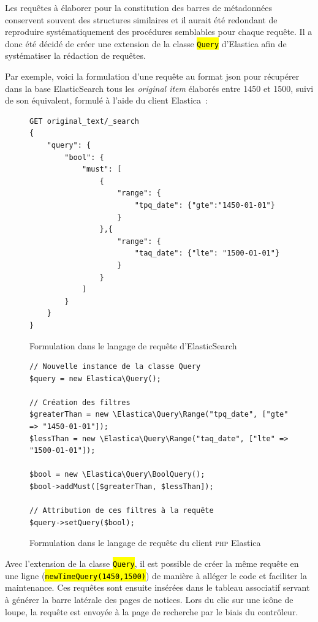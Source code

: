 \documentclass[a4paper,12pt,twoside]{book}
\let\OldTexttt\texttt
\renewcommand{\texttt}[1]{\OldTexttt{\hl{#1}}}
\newcommand{\eng}{\emph}
\newcommand{\oi}{\eng{original item}\xspace}
\newcommand{\json}{\gls{json}\xspace}
\begin{document}
Les requêtes à élaborer pour la constitution des barres de métadonnées conservent souvent des structures similaires et il aurait été redondant de reproduire systématiquement des procédures semblables pour chaque requête. Il a donc été décidé de créer une extension de la classe \texttt{Query} d'Elastica afin de systématiser la rédaction de requêtes.

Par exemple, voici la formulation d'une requête au format \json pour récupérer dans la base ElasticSearch tous les \oi élaborés entre 1450 et 1500, suivi de son équivalent, formulé à l'aide du client Elastica~:

\begin{figure}[H]
\begin{lstlisting}
GET original_text/_search
{
    "query": {
        "bool": {
            "must": [
                {
                    "range": {
                        "tpq_date": {"gte":"1450-01-01"}
                    }
                },{
                    "range": {
                        "taq_date": {"lte": "1500-01-01"}
                    }
                }
            ]
        }
    }
}
\end{lstlisting}
\caption{Formulation dans le langage de requête d'ElasticSearch}
\end{figure}

\begin{figure}[H]
\begin{lstlisting}
// Nouvelle instance de la classe Query
$query = new Elastica\Query();

// Création des filtres
$greaterThan = new \Elastica\Query\Range("tpq_date", ["gte" => "1450-01-01"]);
$lessThan = new \Elastica\Query\Range("taq_date", ["lte" => "1500-01-01"]);

$bool = new \Elastica\Query\BoolQuery();
$bool->addMust([$greaterThan, $lessThan]);

// Attribution de ces filtres à la requête
$query->setQuery($bool);
\end{lstlisting}
\caption{Formulation dans le langage de requête du client \textsc{php} Elastica}
\end{figure}

Avec l'extension de la classe \texttt{Query}, il est possible de créer la même requête en une ligne (\texttt{newTimeQuery(1450,1500)}) de manière à alléger le code et faciliter la maintenance. Ces requêtes sont ensuite insérées dans le tableau associatif servant à générer la barre latérale des pages de notices. Lors du clic sur une icône de loupe, la requête est envoyée à la page de recherche par le biais du contrôleur.
\end{document}
